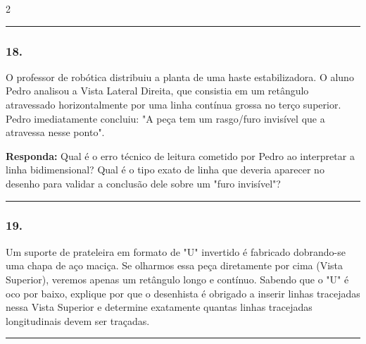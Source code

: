 \documentclass[twoside, 10pt, a4paper]{article}
\newlength{\espacoPreQuestao}\setlength{\espacoPreQuestao}{0.1cm}
\newlength{\espacoQuestao}\setlength{\espacoQuestao}{0.2cm}
\begin{document}
\begin{multicols*}{2}
\noindent\textcolor{CorLinha}{\rule{\linewidth}{0.5pt}} 
\par\vspace{\espacoPreQuestao}
\subsubsection*{18.} O professor de robótica distribuiu a planta de uma haste estabilizadora. O aluno Pedro analisou a Vista Lateral Direita, que consistia em um retângulo atravessado horizontalmente por uma linha contínua grossa no terço superior. Pedro imediatamente concluiu: "A peça tem um rasgo/furo invisível que a atravessa nesse ponto".
\begin{boxresponda}
\textbf{Responda:} Qual é o erro técnico de leitura cometido por Pedro ao interpretar a linha bidimensional? Qual é o tipo exato de linha que deveria aparecer no desenho para validar a conclusão dele sobre um "furo invisível"?
\end{boxresponda}
\par\vspace{\espacoQuestao}

\noindent\textcolor{CorLinha}{\rule{\linewidth}{0.5pt}} 
\par\vspace{\espacoPreQuestao}
\subsubsection*{19.} Um suporte de prateleira em formato de "U" invertido é fabricado dobrando-se uma chapa de aço maciça. Se olharmos essa peça diretamente por cima (Vista Superior), veremos apenas um retângulo longo e contínuo. Sabendo que o "U" é oco por baixo, explique por que o desenhista é obrigado a inserir linhas tracejadas nessa Vista Superior e determine exatamente quantas linhas tracejadas longitudinais devem ser traçadas.
\par\vspace{\espacoQuestao}

\noindent\textcolor{CorLinha}{\rule{\linewidth}{0.5pt}} 
\par\vspace{\espacoPreQuestao}

\end{multicols*}
\end{document}
